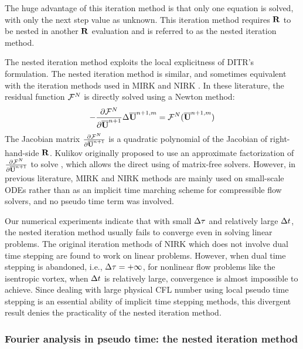 The huge advantage of this iteration method is that only one equation is solved,
with only the next step value as unknown.
This iteration method requires $\mathbf{R}$ to be nested in another $\mathbf{R}$ evaluation and
is referred to as the nested iteration method.

The nested iteration method exploits the
local explicitness of DITR's formulation.
The nested iteration method is similar, and sometimes equivalent with
the iteration methods used in MIRK \cite{cash1975classMIRKOrig,cash1977clasMIRK1,cash1982monoMIRK2}
and NIRK \cite{kulikov2006familyNIRKOrig,kulikov2009adaptive,kulikov2007asymptotic}.
In these literature, the residual function $\mathcal{F}^N$ is directly
solved using a Newton method:
\begin{equation}
    -\partialderivative{\FF^N}{\uu^{n+1}}
    \inc\uu^{n+1,m} = \FF^N(\uu^{n+1,m})
    \label{eq:abstractNewtonNestedNoTau}
\end{equation}
The Jacobian matrix $\partialderivative{\FF^N}{\uu^{n+1}}$
is a quadratic polynomial of the Jacobian of right-hand-side $\mathbf{R}$.
Kulikov originally proposed to use an approximate factorization \cite{kulikov2006familyNIRKOrig}
of $\partialderivative{\FF^N}{\uu^{n+1}}$ to solve ,
which allows the direct using of matrix-free solvers.
However, in previous literature, MIRK and NIRK methods are mainly used on small-scale
ODEs rather than as an implicit time marching scheme for compressible flow solvers,
and no pseudo time term was involved.

Our numerical experiments indicate that with small ${\Delta}\tau$
and relatively large ${\Delta} t$,
the nested iteration method 
usually fails to converge even in solving linear problems.
The original iteration methods of NIRK 
which does not involve dual time stepping
are found to work on linear problems.
However,  when dual time stepping is abandoned, i.e., ${\Delta} \tau=+\infty$,
for nonlinear flow problems like the isentropic vortex,
when ${\Delta} t$ is relatively large, convergence is almost impossible
to achieve.
Since dealing with large physical CFL number using local
pseudo time stepping is an essential ability of implicit
time stepping methods,
this divergent result denies the practicality of the
nested iteration method.






\subsubsection{Fourier analysis in pseudo time: the nested iteration method}

